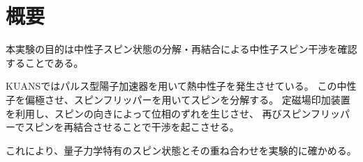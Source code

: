 \section*{概要}
本実験の目的は中性子スピン状態の分解・再結合による中性子スピン干渉を確認することである。

KUANSではパルス型陽子加速器を用いて熱中性子を発生させている。
この中性子を偏極させ、スピンフリッパーを用いてスピンを分解する。
定磁場印加装置を利用し、スピンの向きによって位相のずれを生じさせ、
再びスピンフリッパーでスピンを再結合させることで干渉を起こさせる。

これにより、量子力学特有のスピン状態とその重ね合わせを実験的に確かめる。
